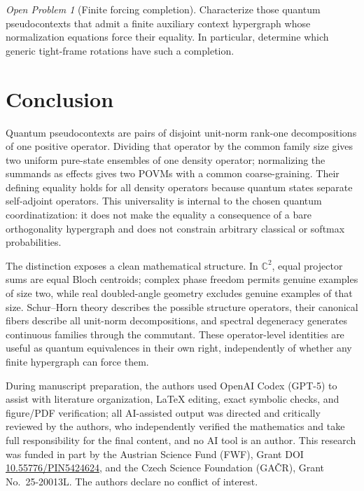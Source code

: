 \documentclass[
  twocolumn,
  aps,
  pra,
  floatfix,
  amsmath,amssymb,
  longbibliography
]{revtex4-2}
\theoremstyle{definition}
\theoremstyle{remark}
\newtheorem{problem}[theorem]{Open Problem}
\newcommand{\C}{\mathbb C}
\newcommand{\1}{\mathbf 1}
\begin{document}
\begin{problem}[Finite forcing completion]
Characterize those quantum pseudocontexts that admit a finite auxiliary
context hypergraph whose normalization equations force their equality.  In
particular, determine which generic tight-frame rotations have such a
completion.
\end{problem}

\section{Conclusion}

Quantum pseudocontexts are pairs of disjoint unit-norm rank-one
decompositions of one positive operator.  Dividing that operator by the
common family size gives two uniform pure-state ensembles of one density
operator; normalizing the summands as effects gives two POVMs with a common
coarse-graining.  Their defining equality holds for all density operators
because quantum states separate self-adjoint operators.
This universality is internal to the chosen quantum coordinatization: it does
not make the equality a consequence of a bare orthogonality hypergraph and
does not constrain arbitrary classical or softmax probabilities.

The distinction exposes a clean mathematical structure.  In $\C^2$, equal
projector sums are equal Bloch centroids; complex phase freedom permits
genuine examples of size two, while real doubled-angle geometry excludes
genuine examples of that size.  Schur--Horn theory
describes the possible structure operators, their canonical fibers describe
all unit-norm decompositions, and spectral degeneracy generates continuous
families through the commutant.  These operator-level identities are useful
as quantum equivalences in their own right, independently of whether any
finite hypergraph can force them.



\begin{acknowledgments}
During manuscript preparation, the authors used OpenAI Codex (GPT-5) to assist with literature organization, LaTeX editing, exact symbolic checks, and figure/PDF verification; all AI-assisted output was directed and critically reviewed by the authors, who independently verified the mathematics and take full responsibility for the final content, and no AI tool is an author.
This research was funded in part by the Austrian
Science Fund (FWF), Grant DOI \href{https://doi.org/10.55776/PIN5424624}{10.55776/PIN5424624}, and the Czech Science
Foundation (GA\v{C}R), Grant No.~25-20013L.  The authors declare no
conflict of interest.
\end{acknowledgments}


\end{document}
